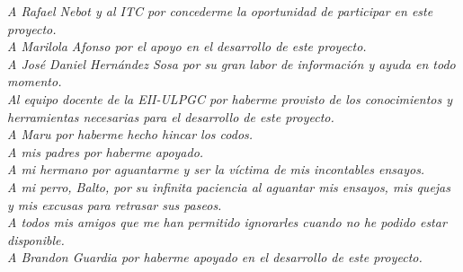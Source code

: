 
\begin{flushright}
    {\setlength{\parskip}{8mm}
        \large{
            \textit{A Rafael Nebot y al ITC por concederme la oportunidad de participar en este proyecto.}\\
            \textit{A Marilola Afonso por el apoyo en el desarrollo de este proyecto.}\\
            \textit{A José Daniel Hernández Sosa por su gran labor de información y ayuda en todo momento.}\\
            \textit{Al equipo docente de la EII-ULPGC por haberme provisto de los conocimientos y herramientas necesarias para el desarrollo de este proyecto.}\\
            \textit{A Maru por haberme hecho hincar los codos.}\\
            \textit{A mis padres por haberme apoyado.}\\
            \textit{A mi hermano por aguantarme y ser la víctima de mis incontables ensayos.}\\
            \textit{A mi perro, Balto, por su infinita paciencia al aguantar mis ensayos, mis quejas y mis excusas para retrasar sus paseos.}\\
            \textit{A todos mis amigos que me han permitido ignorarles cuando no he podido estar disponible.}\\
            \textit{A Brandon Guardia por haberme apoyado en el desarrollo de este proyecto.}
            
        }
    }
    
\end{flushright}